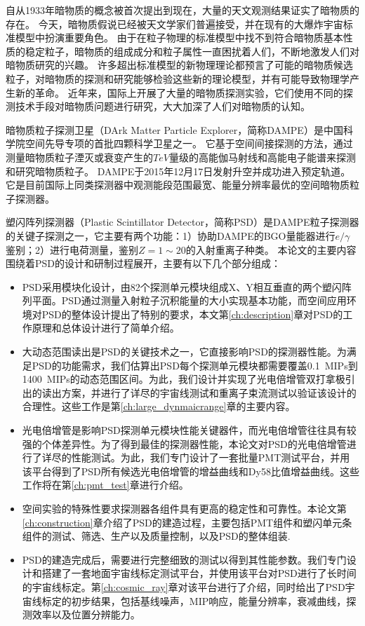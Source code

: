 
\begin{cabstract}
自从1933年暗物质的概念被首次提出到现在，大量的天文观测结果证实了暗物质的存在。
今天，暗物质假说已经被天文学家们普遍接受，并在现有的大爆炸宇宙标准模型中扮演重要角色。
由于在粒子物理的标准模型中找不到符合暗物质基本性质的稳定粒子，暗物质的组成成分和粒子属性一直困扰着人们，不断地激发人们对暗物质研究的兴趣。
许多超出标准模型的新物理理论都预言了可能的暗物质候选粒子，对暗物质的探测和研究能够检验这些新的理论模型，并有可能导致物理学产生新的革命。
近年来，国际上开展了大量的暗物质探测实验，它们使用不同的探测技术手段对暗物质问题进行研究，大大加深了人们对暗物质的认知。

暗物质粒子探测卫星（DArk Matter Particle Explorer，简称DAMPE）是中国科学院空间先导专项的首批四颗科学卫星之一。
它基于空间间接探测的方法，通过测量暗物质粒子湮灭或衰变产生的$TeV$量级的高能伽马射线和高能电子能谱来探测和研究暗物质粒子。
DAMPE于2015年12月17日发射升空并成功进入预定轨道。
它是目前国际上同类探测器中观测能段范围最宽、能量分辨率最优的空间暗物质粒子探测器。

塑闪阵列探测器（Plastic Scintillator Detector，简称PSD）是DAMPE粒子探测器的关键子探测之一，它主要有两个功能：1）协助DAMPE的BGO量能器进行$e/\gamma$鉴别；2）进行电荷测量，鉴别$Z=1\sim 20$的入射重离子种类。
本论文的主要内容围绕着PSD的设计和研制过程展开，主要有以下几个部分组成：
\begin{itemize}
  \item PSD采用模块化设计，由82个探测单元模块组成X、Y相互垂直的两个塑闪阵列平面。PSD通过测量入射粒子沉积能量的大小实现基本功能，而空间应用环境对PSD的整体设计提出了特别的要求，本文第\ref{ch:description}章对PSD的工作原理和总体设计进行了简单介绍。
  \item 大动态范围读出是PSD的关键技术之一，它直接影响PSD的探测器性能。为满足PSD的功能需求，我们估算出PSD每个探测单元模块都需要覆盖\SI{0.1}{MIPs}到\SI{1400}{MIPs}的动态范围区间。为此，我们设计并实现了光电倍增管双打拿极引出的读出方案，并进行了详尽的宇宙线测试和重离子束流测试以验证该设计的合理性。这些工作是第\ref{ch:large_dynmaicrange}章的主要内容。
  \item 光电倍增管是影响PSD探测单元模块性能关键器件，而光电倍增管往往具有较强的个体差异性。为了得到最佳的探测器性能，本论文对PSD的光电倍增管进行了详尽的性能测试。为此，我们专门设计了一套批量PMT测试平台，并用该平台得到了PSD所有候选光电倍增管的增益曲线和Dy58比值增益曲线。这些工作将在第\ref{ch:pmt_test}章进行介绍。
  \item 空间实验的特殊性要求探测器各组件具有更高的稳定性和可靠性。本论文第\ref{ch:construction}章介绍了PSD的建造过程，主要包括PMT组件和塑闪单元条组件的测试、筛选、生产以及质量控制，以及PSD的整体组装.
  \item PSD的建造完成后，需要进行完整细致的测试以得到其性能参数。我们专门设计和搭建了一套地面宇宙线标定测试平台，并使用该平台对PSD进行了长时间的宇宙线标定。第\ref{ch:cosmic_ray}章对该平台进行了介绍，同时给出了PSD宇宙线标定的初步结果，包括基线噪声，MIP响应，能量分辨率，衰减曲线，探测效率以及位置分辨能力。
\end{itemize}


\end{cabstract}

